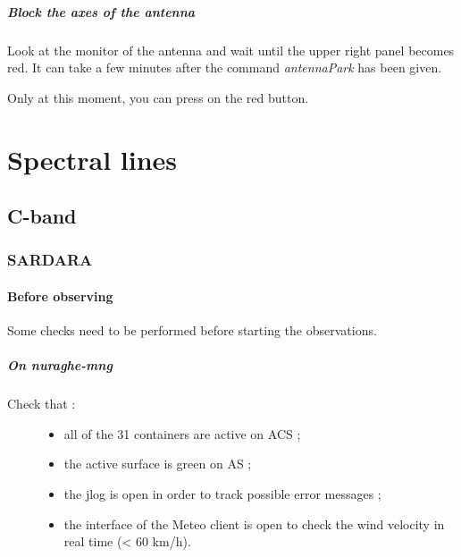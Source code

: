 \documentclass[letterpaper,10pt,english]{sphinxmanual}
\begin{document}
\subparagraph{Block the axes of the antenna}
\label{Continuum/L-band/SARDARA/stop-session:block-the-axes-of-the-antenna}
Look at the monitor of the antenna and wait until the upper right
panel becomes red. It can take a few minutes after the command
\emph{antennaPark} has been given.

Only at this moment, you can press on the red button.


\section{Spectral lines}
\label{SpectralLine/index:spectral-lines}\label{SpectralLine/index::doc}

\subsection{C-band}
\label{SpectralLine/C-band/index::doc}\label{SpectralLine/C-band/index:c-band}

\subsubsection{SARDARA}
\label{SpectralLine/C-band/SARDARA/index:sardara}\label{SpectralLine/C-band/SARDARA/index::doc}

\paragraph{Before observing}
\label{SpectralLine/C-band/SARDARA/before-obs:before-observing}\label{SpectralLine/C-band/SARDARA/before-obs::doc}
Some checks need to be performed before starting the observations.


\subparagraph{On nuraghe-mng}
\label{SpectralLine/C-band/SARDARA/before-obs:on-nuraghe-mng}\begin{description}
\item[{Check that :}] \leavevmode\begin{itemize}
\item {} 
all of the 31 containers are active on ACS ;

\item {} 
the active surface is green on AS ;

\item {} 
the jlog is open in order to track possible error messages ;

\item {} 
the interface of the Meteo client is open to check the wind velocity in real time (\textless{} 60 km/h).

\end{itemize}

\end{description}
\end{document}
